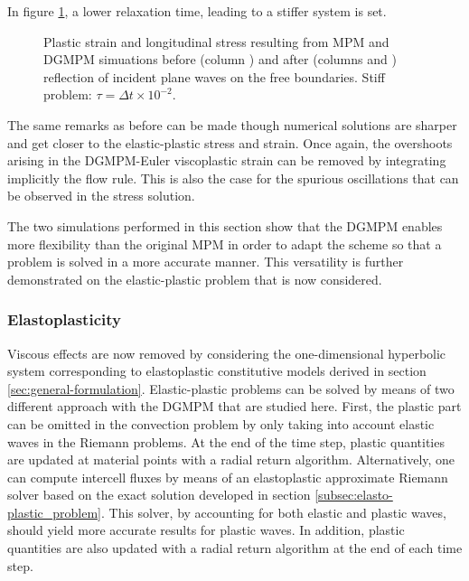 In figure \ref{fig:siff_elastoviscoplastic_RP}, a lower relaxation time, leading to a stiffer system is set.
\begin{figure}[h!]
  \centering
  { \label{subfig:evp_stiff1}}
  { \label{subfig:evp_stiff2}}
  { \label{subfig:evp_stiff3}}
  {}
  \caption{Plastic strain and longitudinal stress resulting from MPM and DGMPM simuations before (column ) and after (columns  and ) reflection of incident plane waves on the free boundaries. Stiff problem: $\tau=\Delta t \times 10^{-2}$.}
  \label{fig:siff_elastoviscoplastic_RP}
\end{figure}
The same remarks as before can be made though numerical solutions are sharper and get closer to the elastic-plastic stress and strain. Once again, the overshoots arising in the DGMPM-Euler viscoplastic strain can be removed by integrating implicitly the flow rule. This is also the case for the spurious oscillations that can be observed in the stress solution. %

The two simulations performed in this section show that the DGMPM enables more flexibility than the original MPM in order to adapt the scheme so that a problem is solved in a more accurate manner. This versatility is further demonstrated on the elastic-plastic problem that is now considered.

\subsubsection{Elastoplasticity}
Viscous effects are now removed by considering the one-dimensional hyperbolic system corresponding to elastoplastic constitutive models derived in section \ref{sec:general-formulation}. Elastic-plastic problems can be solved by means of two different approach with the DGMPM that are studied here. First, the plastic part can be omitted in the convection problem by only taking into account elastic waves in the Riemann problems. At the end of the time step, plastic quantities are updated at material points with a radial return algorithm. %
Alternatively, one can compute intercell fluxes by means of an elastoplastic approximate Riemann solver based on the exact solution developed in section \ref{subsec:elasto-plastic_problem}. This solver, by accounting for both elastic and plastic waves, should yield more accurate results for plastic waves. In addition, plastic quantities are also updated with a radial return algorithm at the end of each time step.

